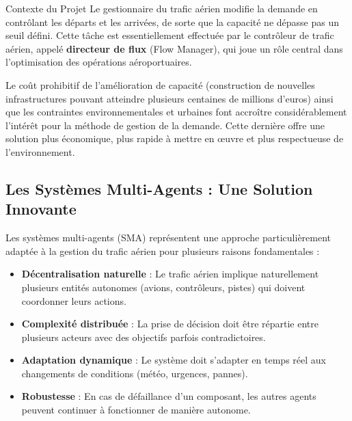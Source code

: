 \documentclass[12pt,a4paper]{article}
\begin{document}
\begin{infobox}{Contexte du Projet}
Le gestionnaire du trafic aérien modifie la demande en contrôlant les départs et les arrivées, de sorte que la capacité ne dépasse pas un seuil défini. Cette tâche est essentiellement effectuée par le contrôleur de trafic aérien, appelé \textbf{directeur de flux} (Flow Manager), qui joue un rôle central dans l'optimisation des opérations aéroportuaires.
\end{infobox}

Le coût prohibitif de l'amélioration de capacité (construction de nouvelles infrastructures pouvant atteindre plusieurs centaines de millions d'euros) ainsi que les contraintes environnementales et urbaines font accroître considérablement l'intérêt pour la méthode de gestion de la demande. Cette dernière offre une solution plus économique, plus rapide à mettre en œuvre et plus respectueuse de l'environnement.

\subsection{Les Systèmes Multi-Agents : Une Solution Innovante}

Les systèmes multi-agents (SMA) représentent une approche particulièrement adaptée à la gestion du trafic aérien pour plusieurs raisons fondamentales :

\begin{itemize}[leftmargin=*]
    \item[\color{primaryblue}$\blacktriangleright$] \textbf{Décentralisation naturelle} : Le trafic aérien implique naturellement plusieurs entités autonomes (avions, contrôleurs, pistes) qui doivent coordonner leurs actions.

    \item[\color{primaryblue}$\blacktriangleright$] \textbf{Complexité distribuée} : La prise de décision doit être répartie entre plusieurs acteurs avec des objectifs parfois contradictoires.

    \item[\color{primaryblue}$\blacktriangleright$] \textbf{Adaptation dynamique} : Le système doit s'adapter en temps réel aux changements de conditions (météo, urgences, pannes).

    \item[\color{primaryblue}$\blacktriangleright$] \textbf{Robustesse} : En cas de défaillance d'un composant, les autres agents peuvent continuer à fonctionner de manière autonome.
\end{itemize}
\end{document}
